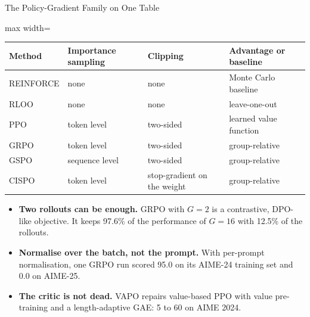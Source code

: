 \begin{frame}{The Policy-Gradient Family on One Table}
    \begin{center}
    \small
    \begin{adjustbox}{max width=\linewidth}\begin{tabular}{llll}
        \toprule
        \textbf{Method} & \textbf{Importance sampling} & \textbf{Clipping} & \textbf{Advantage or baseline} \\
        \midrule
        REINFORCE & none & none & Monte Carlo baseline \\
        RLOO & none & none & leave-one-out \\
        PPO & token level & two-sided & learned value function \\
        GRPO & token level & two-sided & group-relative \\
        GSPO & sequence level & two-sided & group-relative \\
        \rowcolor{KAUSTcyan!12} CISPO & token level & stop-gradient on the weight & group-relative \\
        \bottomrule
    \end{tabular}\end{adjustbox}
    \end{center}
    \begin{itemize}\itemsep0.25em
        \item \textbf{Two rollouts can be enough.} GRPO with $G=2$ is a contrastive, DPO-like objective. It keeps 97.6\% of the performance of $G=16$ with 12.5\% of the rollouts.
        \item \textbf{Normalise over the batch, not the prompt.} With per-prompt normalisation, one GRPO run scored 95.0 on its AIME-24 training set and \alert{0.0} on AIME-25.
        \item \textbf{The critic is not dead.} VAPO repairs value-based PPO with value pre-training and a length-adaptive GAE: 5 to 60 on AIME 2024.
    \end{itemize}
\end{frame}

